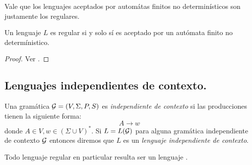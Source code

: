 \documentclass[tesis.tex]{subfiles}
\begin{document}
Vale que los lenguajes aceptados por automátas finitos no determinísticos son justamente los regulares.

\begin{teo}
	Un lenguaje $L$ es regular si y solo sí es aceptado por un autómata finito no determínistico.
\end{teo}

\begin{proof}
	Ver \cite{hopcraft-ullman}.
\end{proof}


\subsection{Lenguajes independientes de contexto.} \label{subs_ic}
\begin{deff}
	Una gramática ${\cal G} = (V, \Sigma, P, S) $ es \emph{independiente de contexto} si las producciones tienen la siguiente forma:
	\begin{equation*}
		A \to w
	\end{equation*}
	donde $A \in V, w \in (\Sigma \cup V)^*$.  
	Si $L=L({\cal G})$ para alguna gramática independiente de contexto $\cal G$ entonces diremos que $L$ es un \emph{lenguaje independiente de contexto}.
\end{deff}

\begin{obs}
	Todo lenguaje regular en particular resulta ser un lenguaje \ic.
\end{obs}
\end{document}
